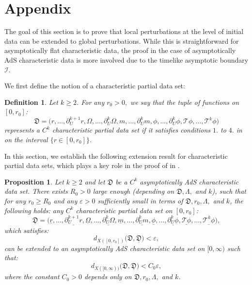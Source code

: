 \documentclass[11pt]{article}
\newtheorem{definition}{Definition}[section]
\newtheorem{proposition}{Proposition}[section]
\numberwithin{equation}{section}
\begin{document}
\appendix
\section{Appendix}\label{appendix}
The goal of this section is to prove that local perturbations at the level of initial data can be extended to global perturbations. While this is straightforward for asymptotically flat characteristic data, the proof in the case of asymptotically AdS characteristic data is more involved due to the timelike asymptotic boundary $\mathcal{I}.$

We first define the notion of a characteristic partial data set:
\begin{definition}\label{partial data set definition}
    Let $k\geq2$. For any $r_0>0,$ we say that the tuple of functions on $[0,r_0]$:
    \[\mathfrak{D}=\big(r,\ldots,\partial_U^{k+1}r,\Omega,\ldots,\partial_U^k\Omega,m,\ldots,\partial_U^km,\phi,\ldots,\partial_U^k\phi,\mathcal{T}\phi,\ldots,\mathcal{T}^k\phi\big)\]
    represents a $C^k$ characteristic \textit{partial} data set if it satisfies conditions $1.$ to $4.$ in  on the interval $\{r\in[0,r_0]\}$.
\end{definition}

In this section, we establish the following extension result for characteristic partial data sets, which plays a key role in the proof of  in .

\begin{proposition}\label{local perturbation extension proposition}
    Let $k\geq2$ and let  $\mathfrak{D}$ be a $C^k$ asymptotically AdS characteristic data set. There exists $R_0>0$ large enough (depending on $\mathfrak{D},\Lambda,$ and $k$), such that for any $r_0\geq R_0$ and any $\varepsilon>0$ sufficiently small in terms of $\mathfrak{D},r_0,\Lambda,$ and $k$, the following holds: any $C^k$ characteristic partial data set on $[0,r_0]$: \[\underline{\mathfrak{D}}=\big(\underline{r},\ldots,\underline{\partial_U^{k+1}r},\underline{\Omega},\ldots,\underline{\partial_U^k\Omega},\underline{m},\ldots,\underline{\partial_U^km},\underline{\phi},\ldots,\underline{\partial_U^k\phi},\underline{\mathcal{T}\phi},\ldots,\underline{\mathcal{T}^k\phi}\big),\]  
    which satisfies:
    \begin{equation}\label{smallness in a finite region}
        d_{X([0,r_0])}\big(\mathfrak{D},\underline{\mathfrak{D}}\big)<\varepsilon,
    \end{equation}
    can be extended to an asymptotically AdS characteristic data set on $[0,\infty)$ such that:
    \begin{equation}\label{smallness of extension}
        d_{X([0,\infty))}\big(\mathfrak{D},\underline{\mathfrak{D}}\big)<C_0\varepsilon,
    \end{equation}
    where the constant $C_0>0$ depends only on $\mathfrak{D},r_0,\Lambda,$ and $k$. 
\end{proposition}
\end{document}

